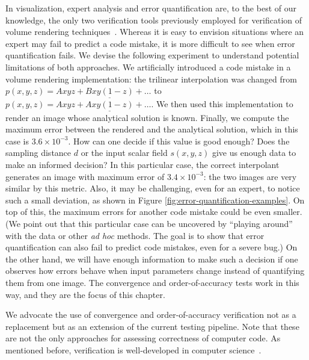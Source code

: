 In visualization, expert analysis and error quantification are, to the
best of our knowledge, the only two verification tools previously employed for
verification of volume rendering
techniques~\cite{Meissner:2000:PEP:353888.353903,
  Moller:1996:CLE:236226.236235,
  Smelyanskiy:2009:MHV:1638611.1639155}. Whereas it is easy to envision
situations where an expert may fail to predict a code mistake, it is
more difficult to see when error quantification fails.  We devise the
following experiment to understand potential limitations of both
approaches. We artificially introduced a code mistake in a volume
rendering implementation: the trilinear interpolation was changed from
$p(x,y,z) = Axyz + \underline{Bxy(1-z)} + \ldots$ to $p(x,y,z) = Axyz
+ \underline{Axy(1-z)} + \ldots$. We then used this implementation to
render an image whose analytical solution is known. Finally, we
compute the maximum error between the rendered and the analytical
solution, which in this case is $3.6 \times 10^{-3}$. How can one
decide if this value is good enough?  Does the sampling distance $d$
or the input scalar field $s(x,y,z)$ give us enough data to make an
informed decision? In this particular case, the correct interpolant
generates an image with maximum error of $3.4 \times 10^{-3}$: the two
images are very similar by this metric. Also, it may be challenging,
even for an expert, to notice such a small deviation, as shown in Figure
\ref{fig:error-quantification-examples}. On top of this, the maximum
errors for another code mistake could be even smaller.
%
(We point out that this particular case can be
uncovered by ``playing around'' with the data or other \emph{ad hoc}
methods. The goal 
is to show that error quantification
can also fail to predict code mistakes, even for a severe bug.)
%
On the other hand, we will have enough information to make such a
decision if one observes how errors behave when input parameters
change instead of quantifying them from one image. The convergence
and order-of-accuracy tests work in this way, and they are the focus
of this chapter.

We advocate the use of convergence and order-of-accuracy verification
not as a replacement but as an extension of the current testing
pipeline.  
Note that these are not the only approaches for assessing correctness
of computer code. As mentioned before, verification is well-developed
in computer science~\cite{Clarke08,FLO67,godefroid08,
  Yang:2006:UMC:1189256.1189259}. 

